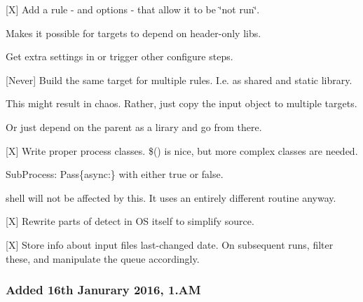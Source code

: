 \begin{DoxyItemize}
\item \mbox{[}X\mbox{]} Add a rule -\/ and options -\/ that allow it to be \char`\"{}not run\char`\"{}.
\begin{DoxyItemize}
\item Makes it possible for targets to depend on header-\/only libs.
\item Get extra settings in or trigger other configure steps.
\end{DoxyItemize}
\item \mbox{[}Never\mbox{]} Build the same target for multiple rules. I.\+e. as shared and static library.
\begin{DoxyItemize}
\item This might result in chaos. Rather, just copy the input object to multiple targets.
\item Or just depend on the parent as a lirary and go from there.
\end{DoxyItemize}
\item \mbox{[}X\mbox{]} Write proper process classes. {\ttfamily \$()} is nice, but more complex classes are needed.
\begin{DoxyItemize}
\item {\ttfamily Sub\+Process}\+: Pass{\ttfamily \{async\+:\}} with either {\ttfamily true} or {\ttfamily false}.
\item {\ttfamily shell} will not be affected by this. It uses an entirely different routine anyway.
\end{DoxyItemize}
\item \mbox{[}X\mbox{]} Rewrite parts of {\ttfamily detect} in OS itself to simplify source.
\item \mbox{[}X\mbox{]} Store info about input files\textquotesingle{} last-\/changed date. On subsequent runs, filter these, and manipulate the queue accordingly.
\end{DoxyItemize}

\subsubsection*{Added 16th Janurary 2016, 1.\+AM}


